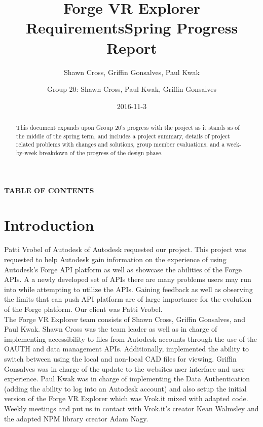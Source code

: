 \documentclass[letterpaper, 10pt, draftclsnofoot, compsoc, onecolumn]{IEEEtran}
\title{Forge VR Explorer Requirements}
\author{Shawn Cross, Griffin Gonsalves, Paul Kwak}
\date{2016-11-3}
\begin{document}
\title{Spring Progress Report}
\author{Group 20: Shawn Cross, Paul Kwak, Griffin Gonsalves}
\maketitle
\hspace*{\fill}\hspace*{\fill}
\vspace{2cm}
\begin{abstract}
This document expands upon Group 20's progress with the project as it stands as of the middle of the spring term, and includes a project summary, details of project related problems with changes and solutions, group member evaluations, and a week-by-week breakdown of the progress of the design phase. 
\end{abstract}
\IEEEpeerreviewmaketitle

\newpage
{}

{\centering{}\bfseries\color{black}
TABLE OF CONTENTS
\par}

\bigskip

\setcounter{tocdepth}{2}
\renewcommand\contentsname{}
\tableofcontents

\bigskip
\clearpage

\section{Introduction}
 Patti Vrobel of Autodesk of Autodesk requested our project. This project was requested to help Autodesk gain information on the experience of using Autodesk's Forge API platform as well as showcase the abilities of the Forge APIs. A a newly developed set of APIs there are many problems users may run into while attempting to utilize the APIs. Gaining feedback as well as observing the limits that can push API platform are of large importance for the evolution of the Forge platform. Our client was Patti Vrobel. \\

The Forge VR Explorer team consists of Shawn Cross, Griffin Gonsalves, and Paul Kwak. Shawn Cross was the team leader as well as in charge of implementing accessibility to files from Autodesk accounts through the use of the OAUTH and data management APIs. Additionally, implemented the ability to switch between using the local and non-local CAD files for viewing. Griffin Gonsalves was in charge of the update to the websites user interface and user experience. Paul Kwak was in charge of implementing the Data Authentication (adding the ability to log into an Autodesk account) and also setup the initial version of the Forge VR Explorer which was Vrok.it mixed with adapted code. Weekly meetings and put us in contact with Vrok.it's creator Kean Walmsley and the adapted NPM library creator Adam Nagy.
\end{document}

